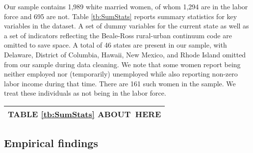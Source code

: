 \documentclass[11pt]{article}
\begin{document}
Our sample contains 1,989 white married women, of whom 1,294 are in the labor force and 695 are not. Table
\ref{tb:SumStats} reports summary statistics for key variables in the dataset. %
A set of dummy variables for the current state %
as well as a
set of indicators reflecting the Beale-Ross rural-urban continuum code %
are omitted to save space.  %
A total of 46 states are present in our sample, with
Delaware, District of Columbia, Hawaii, New Mexico, and Rhode Island omitted %
from our sample during %
data cleaning. %
We note that some women report being neither employed nor
(temporarily) unemployed while also reporting non-zero labor income during that
time. %
There are 161 such
women in the sample. %
We treat these
individuals as not being in the labor force. %


\begin{center}%
\begin{tabular}
[c]{l}\hline\hline
TABLE \ref{tb:SumStats} ABOUT\ HERE\\\hline\hline
\end{tabular}
\end{center} 




\subsection{Empirical findings}
\end{document}
